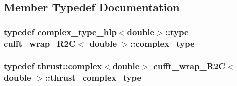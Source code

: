 \subsection{Member Typedef Documentation}
\hypertarget{classcufft__wrap__R2C_3_01double_01_4_ac8d996c3659f68d38626422f74945e06}{
\subsubsection[{complex\-\_\-type}]{\setlength{\rightskip}{0pt plus 5cm}typedef {\bf complex\-\_\-type\-\_\-hlp}$<$double$>$\-::type {\bf cufft\-\_\-wrap\-\_\-\-R2\-C}$<$ double $>$\-::{\bf complex\-\_\-type}}}\label{classcufft__wrap__R2C_3_01double_01_4_ac8d996c3659f68d38626422f74945e06}
\hypertarget{classcufft__wrap__R2C_3_01double_01_4_abc41290148d975b62afbb5988527dc43}{
\subsubsection[{thrust\-\_\-complex\-\_\-type}]{\setlength{\rightskip}{0pt plus 5cm}typedef {\bf thrust\-::complex}$<$double$>$ {\bf cufft\-\_\-wrap\-\_\-\-R2\-C}$<$ double $>$\-::{\bf thrust\-\_\-complex\-\_\-type}}}\label{classcufft__wrap__R2C_3_01double_01_4_abc41290148d975b62afbb5988527dc43}


